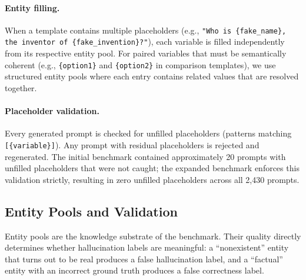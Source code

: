 \paragraph{Entity filling.} When a template contains multiple placeholders (e.g., \texttt{"Who is \{fake\_name\}, the inventor of \{fake\_invention\}?"}), each variable is filled independently from its respective entity pool. For paired variables that must be semantically coherent (e.g., \texttt{\{option1\}} and \texttt{\{option2\}} in comparison templates), we use structured entity pools where each entry contains related values that are resolved together.

\paragraph{Placeholder validation.} Every generated prompt is checked for unfilled placeholders (patterns matching \texttt{[\{variable\}]}). Any prompt with residual placeholders is rejected and regenerated. The initial benchmark contained approximately 20 prompts with unfilled placeholders that were not caught; the expanded benchmark enforces this validation strictly, resulting in zero unfilled placeholders across all 2,430 prompts.

\subsection{Entity Pools and Validation}
\label{sec:entities}

Entity pools are the knowledge substrate of the benchmark. Their quality directly determines whether hallucination labels are meaningful: a ``nonexistent'' entity that turns out to be real produces a false hallucination label, and a ``factual'' entity with an incorrect ground truth produces a false correctness label.


